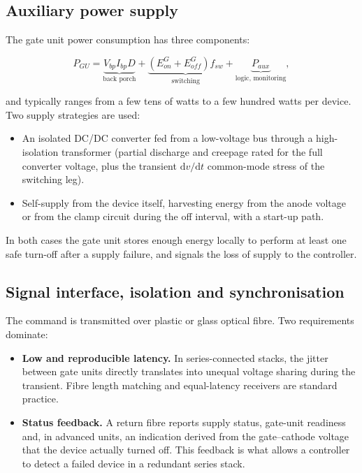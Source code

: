\subsection{Auxiliary power supply}

The gate unit power consumption has three components:

\begin{equation}
P_{GU} = \underbrace{V_{bp} I_{bp} D}_{\text{back porch}}
       + \underbrace{(E_{on}^{G} + E_{off}^{G}) f_{sw}}_{\text{switching}}
       + \underbrace{P_{aux}}_{\text{logic, monitoring}} ,
\end{equation}

and typically ranges from a few tens of watts to a few hundred watts per device.
Two supply strategies are used:

\begin{itemize}[nosep]
  \item An isolated DC/DC converter fed from a low-voltage bus through a
        high-isolation transformer (partial discharge and creepage rated for the
        full converter voltage, plus the transient $\mathrm{d}v/\mathrm{d}t$
        common-mode stress of the switching leg).
  \item Self-supply from the device itself, harvesting energy from the anode
        voltage or from the clamp circuit during the off interval, with a
        start-up path.
\end{itemize}

In both cases the gate unit stores enough energy locally to perform at least one
safe turn-off after a supply failure, and signals the loss of supply to the
controller.

\subsection{Signal interface, isolation and synchronisation}

The command is transmitted over plastic or glass optical fibre. Two requirements
dominate:

\begin{itemize}[nosep]
  \item \textbf{Low and reproducible latency.} In series-connected stacks, the
        jitter between gate units directly translates into unequal voltage
        sharing during the transient. Fibre length matching and equal-latency
        receivers are standard practice.
  \item \textbf{Status feedback.} A return fibre reports supply status,
        gate-unit readiness and, in advanced units, an indication derived from
        the gate--cathode voltage that the device actually turned off. This
        feedback is what allows a controller to detect a failed device in a
        redundant series stack.
\end{itemize}

